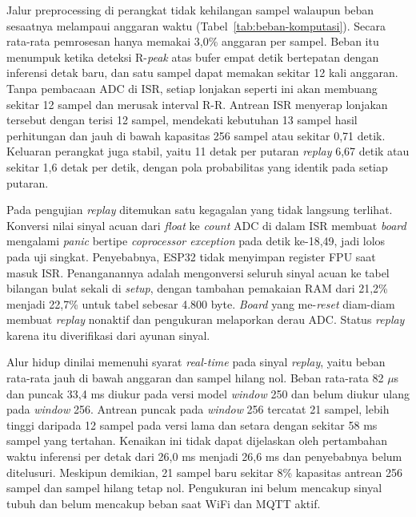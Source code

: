 Jalur preprocessing di perangkat tidak kehilangan sampel walaupun beban sesaatnya melampaui anggaran waktu (Tabel~\ref{tab:beban-komputasi}). Secara rata-rata pemrosesan hanya memakai 3,0\% anggaran per sampel. Beban itu menumpuk ketika deteksi R-\textit{peak} atas bufer empat detik bertepatan dengan inferensi detak baru, dan satu sampel dapat memakan sekitar 12 kali anggaran. Tanpa pembacaan ADC di ISR, setiap lonjakan seperti ini akan membuang sekitar 12 sampel dan merusak interval R-R. Antrean ISR menyerap lonjakan tersebut dengan terisi 12 sampel, mendekati kebutuhan 13 sampel hasil perhitungan dan jauh di bawah kapasitas 256 sampel atau sekitar 0,71 detik. Keluaran perangkat juga stabil, yaitu 11 detak per putaran \textit{replay} 6,67 detik atau sekitar 1,6 detak per detik, dengan pola probabilitas yang identik pada setiap putaran.

Pada pengujian \textit{replay} ditemukan satu kegagalan yang tidak langsung terlihat. Konversi nilai sinyal acuan dari \textit{float} ke \textit{count} ADC di dalam ISR membuat \textit{board} mengalami \textit{panic} bertipe \textit{coprocessor exception} pada detik ke-18,49, jadi lolos pada uji singkat. Penyebabnya, ESP32 tidak menyimpan register FPU saat masuk ISR. Penanganannya adalah mengonversi seluruh sinyal acuan ke tabel bilangan bulat sekali di \textit{setup}, dengan tambahan pemakaian RAM dari 21,2\% menjadi 22,7\% untuk tabel sebesar 4.800 byte. \textit{Board} yang me-\textit{reset} diam-diam membuat \textit{replay} nonaktif dan pengukuran melaporkan derau ADC. Status \textit{replay} karena itu diverifikasi dari ayunan sinyal.

Alur hidup dinilai memenuhi syarat \textit{real-time} pada sinyal \textit{replay}, yaitu beban rata-rata jauh di bawah anggaran dan sampel hilang nol. Beban rata-rata 82 $\mu$s dan puncak 33,4 ms diukur pada versi model \textit{window} 250 dan belum diukur ulang pada \textit{window} 256. Antrean puncak pada \textit{window} 256 tercatat 21 sampel, lebih tinggi daripada 12 sampel pada versi lama dan setara dengan sekitar 58 ms sampel yang tertahan. Kenaikan ini tidak dapat dijelaskan oleh pertambahan waktu inferensi per detak dari 26,0 ms menjadi 26,6 ms dan penyebabnya belum ditelusuri. Meskipun demikian, 21 sampel baru sekitar 8\% kapasitas antrean 256 sampel dan sampel hilang tetap nol. Pengukuran ini belum mencakup sinyal tubuh dan belum mencakup beban saat WiFi dan MQTT aktif.

